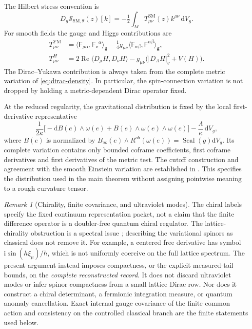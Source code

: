 \documentclass[11pt]{article}
\numberwithin{equation}{section}
\theoremstyle{definition}
\theoremstyle{remark}
\newtheorem{remark}[remark]{Remark}
\newcommand{\dd}{\mathrm d}
\newcommand{\ii}{\mathrm i}
\newcommand{\Rea}{\operatorname{Re}}
\newcommand{\Scal}{\operatorname{Scal}}
\newcommand{\abs}[1]{\lvert#1\rvert}
\newcommand{\ip}[2]{\langle#1,#2\rangle}
\newcommand{\Sact}{\mathscr S}
\newcommand{\Fcurv}{\mathsf F}
\newcommand{\dV}{\dd V}
\begin{document}
The Hilbert stress convention is
\begin{equation}
 D_g\Sact_{\mathrm{SM},\theta}(z)[k]
 =-\tfrac12\int_M T^{\mathrm{SM}}_{\mu\nu}(z)k^{\mu\nu}\,\dV_g.
 \label{eq:stress-definition}
\end{equation}
For smooth fields the gauge and Higgs contributions are
\begin{align}
 T^{\mathrm{YM}}_{\mu\nu}
 &=\ip{\Fcurv_{\mu\alpha}}{\Fcurv_\nu{}^\alpha}_{\boldsymbol g}
   -\tfrac14g_{\mu\nu}\ip{\Fcurv_{\alpha\beta}}{\Fcurv^{\alpha\beta}}_{\boldsymbol g},
 \label{eq:YM-stress}\\
 T^H_{\mu\nu}
 &=2\Rea\ip{D_\mu H}{D_\nu H}
   -g_{\mu\nu}\bigl(\abs{D_AH}_g^2+V(H)\bigr).
 \label{eq:H-stress}
\end{align}
The Dirac--Yukawa contribution is always taken from the complete metric variation of \eqref{eq:dirac-density}. In particular, the spin-connection variation is not dropped by holding a metric-dependent Dirac operator fixed.

At the reduced regularity, the gravitational distribution is fixed by the
local first-derivative representative
\[
 \frac{1}{2\kappa}\bigl[-\dd B(e)\wedge\omega(e)
       +B(e)\wedge\omega(e)\wedge\omega(e)\bigr]
       -\frac{\Lambda}{\kappa}\,\dV_g,
\]
where $B(e)$ is normalized by
$B_{ab}(e)\wedge R^{ab}(\omega(e))=\Scal(g)\dV_g$.
Its complete variation contains only bounded coframe coefficients, first
coframe derivatives and first derivatives of the metric test. The cutoff
construction and agreement with the smooth Einstein variation are established
in . This specifies the distribution used in the main
theorem without assigning pointwise meaning to a rough curvature tensor.

\begin{remark}[Chirality, finite covariance, and ultraviolet modes]
\label{rem:chiral-scope}
The chiral labels specify the fixed continuum representation packet, not a
claim that the finite difference operator is a doubler-free quantum chiral
regulator.  The lattice-chirality obstruction is a spectral issue
\cite{NielsenNinomiya1981,Friedan1982}; describing the variational spinors as
classical does not remove it.  For example, a centered free derivative has
symbol $\ii\sin(h\xi_\mu)/h$, which is not uniformly coercive on the full
lattice spectrum.  The present argument instead imposes compactness, or the
explicit measured-tail bounds, on the \emph{complete reconstructed record}.
It does not discard ultraviolet modes or infer spinor compactness from a
small lattice Dirac row.  Nor does it construct a chiral determinant,
a fermionic integration measure, or quantum anomaly cancellation.  Exact
internal gauge covariance of the finite common action and consistency on
the controlled classical branch are the finite statements used below.
\end{remark}
\end{document}
